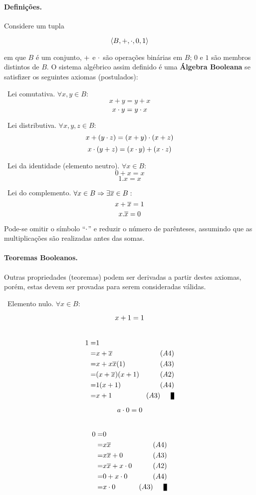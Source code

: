 \paragraph{Definições.}
Considere um tupla

$$\<B,\+,\.,0,1>$$

\noindent em que $B$ é um conjunto, $\+$ e $\.$ são operações binárias
em $B$; $0$ e $1$ são membros distintos de $B$. O sistema algébrico
assim definido é uma {\bf Álgebra Booleana} se satisfizer os seguintes
axiomas (postulados):

\axiom~Lei comutativa. $\forall x,y \in B :$
  $$x+y=y+x$$
  $$x\.y=y\.x$$

\axiom~Lei distributiva. $\forall x,y,z \in B :$
    $$x\+(y\.z)=(x\+y)\.(x\+z)$$
    $$x\.(y\+z)=(x\.y)\+(x\.z)$$

\axiom~Lei da identidade (elemento neutro). $\forall x \in B :$
  $$0+x=x$$
  $$1.x=x$$

\axiom~Lei do complemento. $\forall x \in B \Rightarrow \exists \~x \in B :$
  $$x+\~x=1$$
  $$x.\~x=0$$


Pode-se omitir o símbolo ``$\.$'' e reduzir o número de parênteses, assumindo que 
as multiplicações são realizadas antes das somas.

\paragraph{Teoremas Booleanos.}
Outras propriedades (teoremas) podem ser derivadas a partir destes
axiomas, porém, estas devem ser provadas para serem consideradas
válidas.

~Elemento nulo. $\forall x \in B : $

\begin{minipage}{.5\textwidth}
$$x\+1=1$$
\proof\\
\begin{eqnarray*}
1 =&1& \hfill\\
  =&x\+\~x & (A4)\\
  =&x\+x\~x(1) & (A3)\\
  =&(x\+\~x)(x\+1) & (A2)\\
  =&1(x\+1) & (A4)\\
  =&x\+1 & (A3)\qed\\
\end{eqnarray*}
\end{minipage}
\begin{minipage}{.5\textwidth}
$$a\.0=0$$\\
\begin{eqnarray*}
0 =&0& \hfill\\
  =&x\~x & (A4)\\
  =&x\~x \+0 & (A3)\\
  =&x\~x\+x\.0 & (A2)\\
  =& 0 \+ x\.0 & (A4)\\
  =&x\.0 & (A3)\qed\\
\end{eqnarray*}
\end{minipage}


